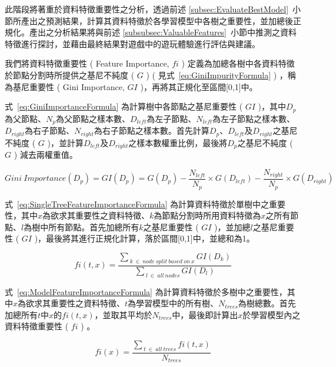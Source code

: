 此階段將著重於資料特徵重要性之分析，透過前述 \ref{subsec:EvaluateBestModel}~小節所產出之預測結果，計算其資料特徵於各學習模型中各樹之重要性，並加總後正規化。產出之分析結果將與前述 \ref{subsubsec:ValuableFeatures}~小節中推測之資料特徵進行探討，並藉由最終結果對遊戲中的遊玩體驗進行評估與建議。

我們將資料特徵重要性 ( Feature Importance, $fi$ ) 定義為加總各樹中各資料特徵於節點分割時所提供之基尼不純度 ( $G$ ) ( 見式~\ref{eq:GiniImpurityFormula} ) ，稱為基尼重要性 ( Gini Importance, $GI$ )，再將其正規化至區間[0,1]中。

式~\ref{eq:GiniImportanceFormula} 為計算樹中各節點之基尼重要性 ( $GI$ )，其中$D_p$為父節點、$N_p$為父節點之樣本數、$D_{left}$為左子節點、$N_{left}$為左子節點之樣本數、$D_{right}$為右子節點、$N_{right}$為右子節點之樣本數。首先計算$D_p$、$D_{left}$及$D_{right}$之基尼不純度 ( $G$ )，並計算$D_{left}$及$D_{right}$之樣本數權重比例，最後將$D_p$之基尼不純度 ( $G$ ) 減去兩權重值。

\begin{equation}
  \label{eq:GiniImportanceFormula}
  Gini\ Importance(D_p) = GI(D_p) = G(D_p) - \frac{N_{left}}{N_p} \times G(D_{left}) - \frac{N_{right}}{N_p} \times G(D_{right})
\end{equation}

式~\ref{eq:SingleTreeFeatureImportanceFormula} 為計算資料特徵於單樹中之重要性，其中$x$為欲求其重要性之資料特徵、$k$為節點分割時所用資料特徵為$x$之所有節點、$l$為樹中所有節點。首先加總所有$k$之基尼重要性 ( $GI$ )，並加總$l$之基尼重要性 ( $GI$ )，最後將其進行正規化計算，落於區間[0,1]中，並總和為1。

\begin{equation}
  \label{eq:SingleTreeFeatureImportanceFormula}
  fi(t,x) = \frac{\sum_{\ k\ \in\ node\ split\ based\ on\ x}GI(D_k)}{\sum_{\ l\ \in\ all\ nodes}GI(D_l)}
\end{equation}

式~\ref{eq:ModelFeatureImportanceFormula} 為計算資料特徵於多樹中之重要性，其中$x$為欲求其重要性之資料特徵、$t$為學習模型中的所有樹、$N_{trees}$為樹總數。首先加總所有$t$中$x$的$fi(t,x)$，並取其平均於$N_{trees}$中，最後即計算出$x$於學習模型內之資料特徵重要性 ( $fi$ ) 。

\begin{equation}
  \label{eq:ModelFeatureImportanceFormula}
  fi(x) = \frac{\sum_{\ t\ \in\ all\ trees}fi(t,x)}{N_{trees}}
\end{equation}
\newpage